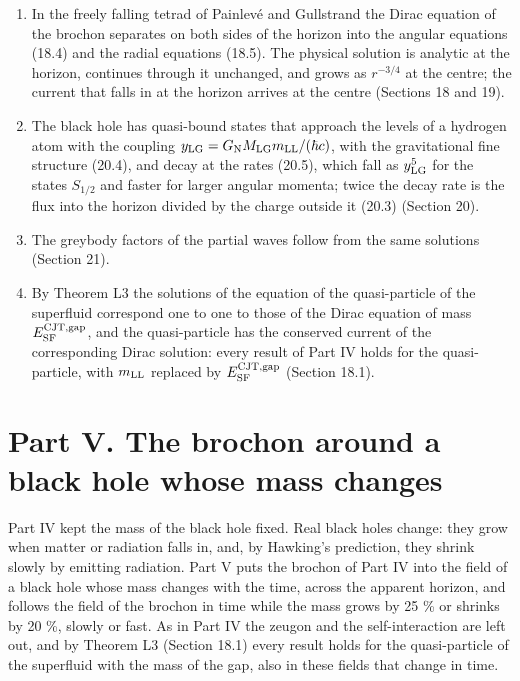 \documentclass[
  10pt,
]{article}
\providecommand{\tightlist}{%
  \setlength{\itemsep}{0pt}\setlength{\parskip}{0pt}}
\begin{document}
\begin{enumerate}
\def\labelenumi{\arabic{enumi}.}
\tightlist
\item
  In the freely falling tetrad of Painlevé and Gullstrand the Dirac
  equation of the brochon separates on both sides of the horizon into
  the angular equations (18.4) and the radial equations (18.5). The
  physical solution is analytic at the horizon, continues through it
  unchanged, and grows as \(r^{-3/4}\) at the centre; the current that
  falls in at the horizon arrives at the centre (Sections 18 and 19).
\item
  The black hole has quasi-bound states that approach the levels of a
  hydrogen atom with the coupling
  \(y_{\rm LG}=G_{\rm N}M_{\rm LG}m_{\rm LL}/(\hbar c)\), with the
  gravitational fine structure (20.4), and decay at the rates (20.5),
  which fall as \(y_{\rm LG}^5\) for the states \(S_{1/2}\) and faster
  for larger angular momenta; twice the decay rate is the flux into the
  horizon divided by the charge outside it (20.3) (Section 20).
\item
  The greybody factors of the partial waves follow from the same
  solutions (Section 21).
\item
  By Theorem L3 the solutions of the equation of the quasi-particle of
  the superfluid correspond one to one to those of the Dirac equation of
  mass \(E^{\rm CJT,gap}_{\rm SF}\), and the quasi-particle has the
  conserved current of the corresponding Dirac solution: every result of
  Part IV holds for the quasi-particle, with \(m_{\rm LL}\) replaced by
  \(E^{\rm CJT,gap}_{\rm SF}\) (Section 18.1).
\end{enumerate}

\hypertarget{part-v.-the-brochon-around-a-black-hole-whose-mass-changes}{%
\section{Part V. The brochon around a black hole whose mass
changes}\label{part-v.-the-brochon-around-a-black-hole-whose-mass-changes}}

Part IV kept the mass of the black hole fixed. Real black holes change:
they grow when matter or radiation falls in, and, by Hawking's
prediction, they shrink slowly by emitting radiation. Part V puts the
brochon of Part IV into the field of a black hole whose mass changes
with the time, across the apparent horizon, and follows the field of the
brochon in time while the mass grows by 25 \% or shrinks by 20 \%,
slowly or fast. As in Part IV the zeugon and the self-interaction are
left out, and by Theorem L3 (Section 18.1) every result holds for the
quasi-particle of the superfluid with the mass of the gap, also in these
fields that change in time.
\end{document}
